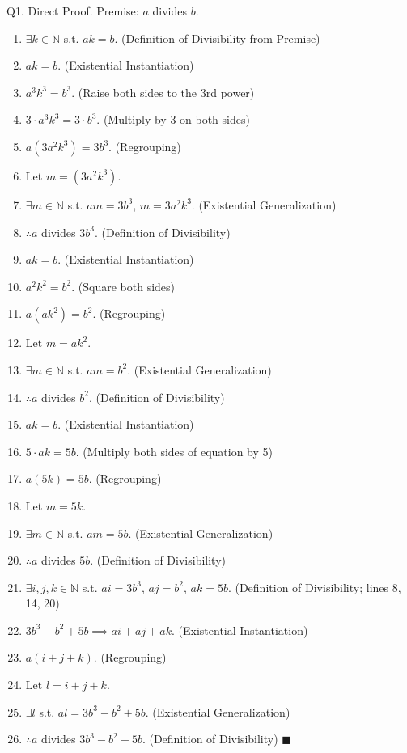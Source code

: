 \documentclass{article}
\begin{document}
			Q1. Direct Proof. Premise: $a$ divides $b$.
				\begin{enumerate}
					\item $\exists k \in \mathbb{N}$ s.t. $ak = b$. (Definition of Divisibility from Premise)
					\item $ak = b$. (Existential Instantiation)
					\item $ a^{3}k^{3} = b^{3}$. (Raise both sides to the 3rd power)
					\item $ 3 \cdot a^{3}k^{3} = 3 \cdot b^{3}$. (Multiply by 3 on both sides)
					\item $a (3a^{2}k^{3}) = 3b^{3}$. (Regrouping)
					\item Let $m = (3a^{2}k^{3})$.
					\item $\exists m \in \mathbb{N}$ s.t. $am = 3b^{3}$, $m = 3a^{2}k^{3}$. (Existential Generalization)
					\item $\therefore a$ divides $3b^{3}$. (Definition of Divisibility)
					
					\item $ak = b$. (Existential Instantiation)
					\item $a^{2}k^{2} = b^{2}$. (Square both sides)
					\item $a(ak^{2}) = b^{2}$. (Regrouping)
					\item Let $m = ak^{2}$.
					\item $\exists m \in \mathbb{N}$ s.t. $am = b^{2}$. (Existential Generalization)
					\item $\therefore a$ divides $b^{2}$. (Definition of Divisibility)

					\item $ak = b$. (Existential Instantiation)
					\item $5 \cdot ak = 5b$. (Multiply both sides of equation by 5)
					\item $a (5k) = 5b$. (Regrouping)
					\item Let $m = 5k$.
					\item $\exists m \in \mathbb{N}$ s.t. $am = 5b$. (Existential Generalization)
					\item $\therefore a$ divides $5b$. (Definition of Divisibility)

					\item $\exists i, j, k \in \mathbb{N}$ s.t. $ai = 3b^{3}$, $aj = b^{2}$, $ak = 5b$. (Definition of Divisibility; lines 8, 14, 20)
					\item $3b^{3} - b^{2} + 5b \implies ai + aj + ak$. (Existential Instantiation)
					\item $a(i + j + k)$. (Regrouping)
					\item Let $l = i + j + k$.
					\item $\exists l$ s.t. $al = 3b^{3} - b^{2} + 5b$. (Existential Generalization)
					\item $\therefore a$ divides $3b^{3} - b^{2} + 5b$. (Definition of Divisibility) $\blacksquare$ 
					
				\end{enumerate}
					
\end{document}
